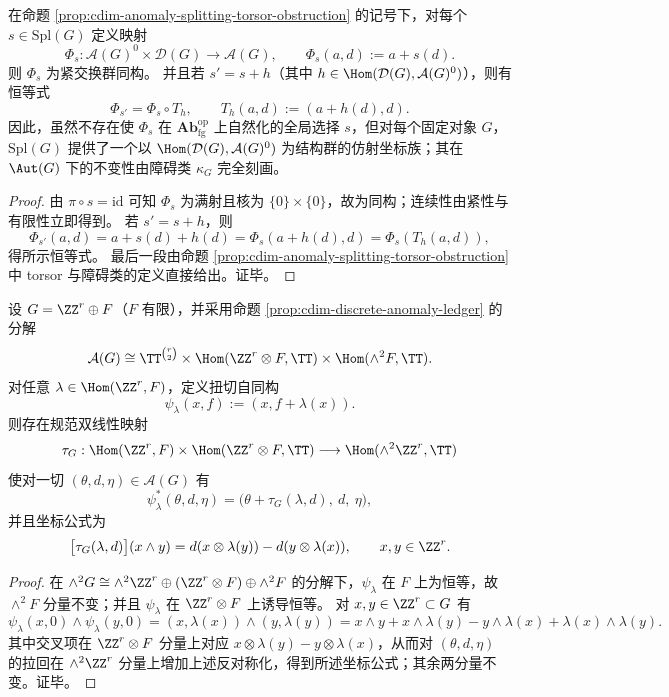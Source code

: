 \begin{theorem}\label{thm:cdim-anomaly-affine-regular-form}
在命题 \ref{prop:cdim-anomaly-splitting-torsor-obstruction} 的记号下，对每个 \(s\in\mathrm{Spl}(G)\) 定义映射
\[
\Phi_s:\mathcal A(G)^0\times \mathcal D(G)\longrightarrow \mathcal A(G),
\qquad
\Phi_s(a,d):=a+s(d).
\]
则 \(\Phi_s\) 为紧交换群同构。
并且若 \(s'=s+h\)（其中 \(h\in\Hom(\mathcal D(G),\mathcal A(G)^0)\)），则有恒等式
\[
\Phi_{s'}=\Phi_s\circ T_h,
\qquad
T_h(a,d):=(a+h(d),d).
\]
因此，虽然不存在使 \(\Phi_s\) 在 \(\mathbf{Ab}_{\mathrm{fg}}^{\mathrm{op}}\) 上自然化的全局选择 \(s\)，但对每个固定对象 \(G\)，\(\mathrm{Spl}(G)\) 提供了一个以 \(\Hom(\mathcal D(G),\mathcal A(G)^0)\) 为结构群的仿射坐标族；其在 \(\Aut(G)\) 下的不变性由障碍类 \(\kappa_G\) 完全刻画。
\end{theorem}
\begin{proof}
由 \(\pi\circ s=\mathrm{id}\) 可知 \(\Phi_s\) 为满射且核为 \(\{0\}\times\{0\}\)，故为同构；连续性由紧性与有限性立即得到。
若 \(s'=s+h\)，则
\[
\Phi_{s'}(a,d)=a+s(d)+h(d)=\Phi_s(a+h(d),d)=\Phi_s(T_h(a,d)),
\]
得所示恒等式。
最后一段由命题 \ref{prop:cdim-anomaly-splitting-torsor-obstruction} 中 torsor 与障碍类的定义直接给出。证毕。
\end{proof}

\begin{theorem}[扭切自同构的双线性耦合公式]\label{thm:cdim-anomaly-twist-ledger-bilinear-coupling}
设 \(G=\ZZ^r\oplus F\)（\(F\) 有限），并采用命题 \ref{prop:cdim-discrete-anomaly-ledger} 的分解
\[
\mathcal A(G)\cong
\TT^{\binom r2}\times \Hom(\ZZ^r\otimes F,\TT)\times \Hom(\wedge^2F,\TT).
\]
对任意 \(\lambda\in\Hom(\ZZ^r,F)\)，定义扭切自同构
\[
\psi_\lambda(x,f):=(x,f+\lambda(x)).
\]
则存在规范双线性映射
\[
\tau_G:\Hom(\ZZ^r,F)\times \Hom(\ZZ^r\otimes F,\TT)\longrightarrow \Hom(\wedge^2\ZZ^r,\TT)
\]
使对一切 \((\theta,d,\eta)\in \mathcal A(G)\) 有
\[
\psi_\lambda^\ast(\theta,d,\eta)=\bigl(\theta+\tau_G(\lambda,d),\ d,\ \eta\bigr),
\]
并且坐标公式为
\[
\bigl[\tau_G(\lambda,d)\bigr](x\wedge y)=d(x\otimes \lambda(y))-d(y\otimes \lambda(x)),
\qquad x,y\in\ZZ^r.
\]
\end{theorem}
\begin{proof}
在 \(\wedge^2G\cong \wedge^2\ZZ^r\oplus(\ZZ^r\otimes F)\oplus\wedge^2F\) 的分解下，\(\psi_\lambda\) 在 \(F\) 上为恒等，故 \(\wedge^2F\) 分量不变；并且 \(\psi_\lambda\) 在 \(\ZZ^r\otimes F\) 上诱导恒等。
对 \(x,y\in\ZZ^r\subset G\) 有
\[
\psi_\lambda(x,0)\wedge\psi_\lambda(y,0)
=(x,\lambda(x))\wedge(y,\lambda(y))
=x\wedge y+x\wedge\lambda(y)-y\wedge\lambda(x)+\lambda(x)\wedge\lambda(y).
\]
其中交叉项在 \(\ZZ^r\otimes F\) 分量上对应 \(x\otimes\lambda(y)-y\otimes\lambda(x)\)，从而对 \((\theta,d,\eta)\) 的拉回在 \(\wedge^2\ZZ^r\) 分量上增加上述反对称化，得到所述坐标公式；其余两分量不变。证毕。
\end{proof}


